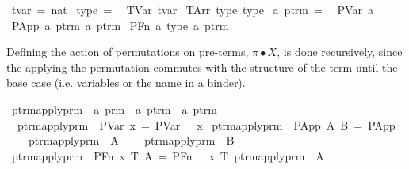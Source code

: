\begin{implementation}
\isamarkupfalse%
\ tvar\ =\ nat\isanewline
\isanewline
{}\isamarkupfalse%
\ type\ =\isanewline
\ \ TVar\ tvar\isanewline
{\isacharbar}\ TArr\ type\ type\isanewline
\isanewline
{}\isamarkupfalse%
\ {\isacharprime}a\ ptrm\ =\isanewline
\ \ PVar\ {\isacharprime}a\isanewline
{\isacharbar}\ PApp\ {\isachardoublequoteopen}{\isacharprime}a\ ptrm{\isachardoublequoteclose}\ {\isachardoublequoteopen}{\isacharprime}a\ ptrm{\isachardoublequoteclose}\isanewline
{\isacharbar}\ PFn\ {\isacharprime}a\ type\ {\isachardoublequoteopen}{\isacharprime}a\ ptrm{\isachardoublequoteclose}\isanewline
\end{implementation}

Defining the action of permutations on pre-terms, \(\pi \bullet X\), is done recursively, since the applying the permutation commutes with the structure of the term until the base case (i.e. variables or the name in a binder).

\begin{implementation}
\isamarkupfalse%
\ ptrm{\isacharunderscore}apply{\isacharunderscore}prm\ {\isacharcolon}{\isacharcolon}\ {\isachardoublequoteopen}{\isacharprime}a\ prm\ {\isasymRightarrow}\ {\isacharprime}a\ ptrm\ {\isasymRightarrow}\ {\isacharprime}a\ ptrm{\isachardoublequoteclose}\isanewline
\ \ {\isachardoublequoteopen}ptrm{\isacharunderscore}apply{\isacharunderscore}prm\ {\isasympi}\ {\isacharparenleft}PVar\ x{\isacharparenright}\ =\ PVar\ {\isacharparenleft}{\isasympi}\ {\isachardollar}\ x{\isacharparenright}{\isachardoublequoteclose}\isanewline
{\isacharbar}\ {\isachardoublequoteopen}ptrm{\isacharunderscore}apply{\isacharunderscore}prm\ {\isasympi}\ {\isacharparenleft}PApp\ A\ B{\isacharparenright}\ =\ PApp\isanewline
\ \ \ \ {\isacharparenleft}ptrm{\isacharunderscore}apply{\isacharunderscore}prm\ {\isasympi}\ A{\isacharparenright}\isanewline
\ \ \ \ {\isacharparenleft}ptrm{\isacharunderscore}apply{\isacharunderscore}prm\ {\isasympi}\ B{\isacharparenright}{\isachardoublequoteclose}\isanewline
{\isacharbar}\ {\isachardoublequoteopen}ptrm{\isacharunderscore}apply{\isacharunderscore}prm\ {\isasympi}\ {\isacharparenleft}PFn\ x\ T\ A{\isacharparenright}\ =\ PFn\ {\isacharparenleft}{\isasympi}\ {\isachardollar}\ x{\isacharparenright}\ T\ {\isacharparenleft}ptrm{\isacharunderscore}apply{\isacharunderscore}prm\ {\isasympi}\ A{\isacharparenright}{\isachardoublequoteclose}\isanewline
\end{implementation}


